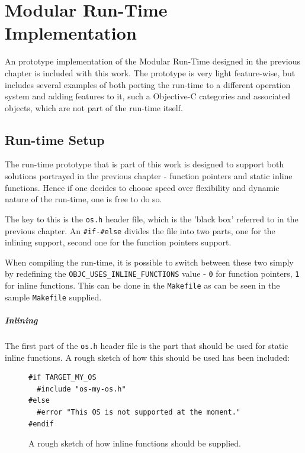 \chapter{Modular Run-Time Implementation}

An prototype implementation of the Modular Run-Time designed in the previous chapter is included with this work. The prototype is very light feature-wise, but includes several examples of both porting the run-time to a different operation system and adding features to it, such a Objective-C categories and associated objects, which are not part of the run-time itself.

\section{Run-time Setup}

The run-time prototype that is part of this work is designed to support both solutions portrayed in the previous chapter - function pointers and static inline functions. Hence if one decides to choose speed over flexibility and dynamic nature of the run-time, one is free to do so.

The key to this is the \verb=os.h= header file, which is the 'black box' referred to in the previous chapter. An \verb=#if-#else= divides the file into two parts, one for the inlining support, second one for the function pointers support.

When compiling the run-time, it is possible to switch between these two simply by redefining the \verb=OBJC_USES_INLINE_FUNCTIONS= value - \verb=0= for function pointers, \verb=1= for inline functions. This can be done in the \verb=Makefile= as can be seen in the sample \verb=Makefile= supplied.

\paragraph{Inlining}

The first part of the \verb=os.h= header file is the part that should be used for static inline functions. A rough sketch of how this should be used has been included:

\begin{figure}[H]
\begin{verbatim}
#if TARGET_MY_OS
  #include "os-my-os.h"
#else
  #error "This OS is not supported at the moment."
#endif
\end{verbatim}
  \centering{}
  \caption{A rough sketch of how inline functions should be supplied.}
  \label{ref:inline_functions_supply}
\end{figure}

